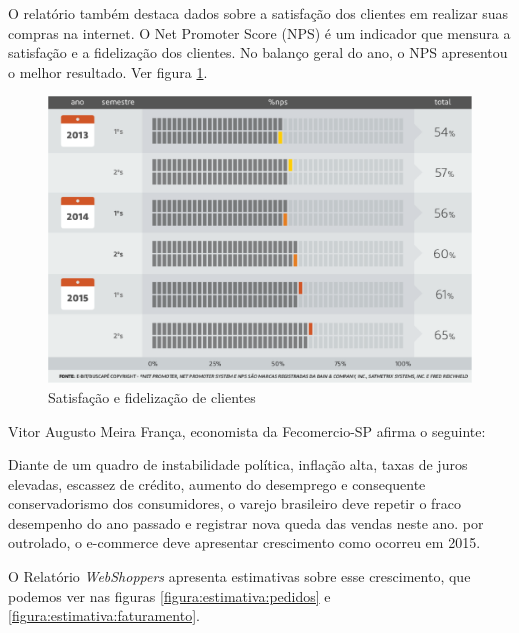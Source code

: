 \documentclass[a4paper,12pt]{monografia}
\begin{document}
O relatório também destaca dados sobre a satisfação dos clientes em realizar suas compras na internet. O Net Promoter Score (NPS) é um indicador que mensura a satisfação e a fidelização dos clientes. No balanço geral do ano, o NPS apresentou o melhor resultado. Ver figura \ref{figura:nps}.

\begin{figure}[H]
\centering
\includegraphics[width=15cm]{img/webshoppers/nps.eps}
\caption{Satisfação e fidelização de clientes}
\label{figura:nps}
\end{figure}

Vitor Augusto Meira França, economista da Fecomercio-SP afirma o seguinte:

\begin{citacao}
	Diante de um quadro de instabilidade política, inflação alta, taxas de juros elevadas, escassez de crédito, aumento do desemprego e consequente conservadorismo dos consumidores, o varejo brasileiro deve repetir o fraco desempenho do ano passado e registrar nova queda das vendas neste ano. por outrolado, o e-commerce deve apresentar crescimento como ocorreu em 2015. \cite{webshoppers}
\end{citacao}

O Relatório \textit{WebShoppers} apresenta estimativas sobre esse crescimento, que podemos ver nas figuras \ref{figura:estimativa:pedidos} e \ref{figura:estimativa:faturamento}.
\end{document}
